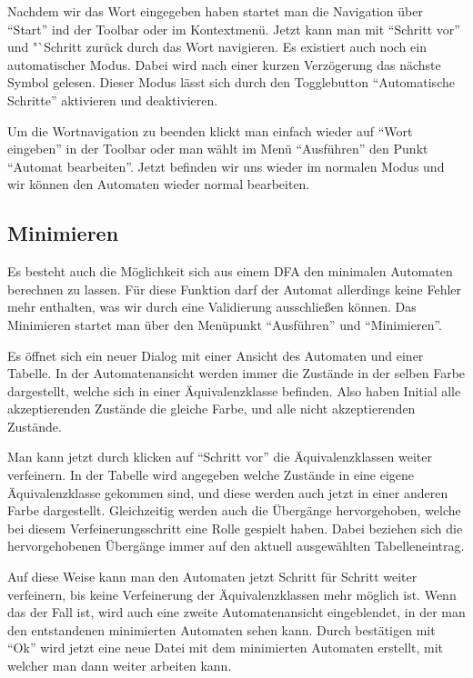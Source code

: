   Nachdem wir das Wort eingegeben haben startet man die Navigation über
  "`Start"' ind der Toolbar oder im Kontextmenü. Jetzt kann man mit "`Schritt
  vor"' und "`Schritt zurück durch das Wort navigieren. Es existiert auch noch
  ein automatischer Modus. Dabei wird nach einer kurzen Verzögerung das nächste
  Symbol gelesen. Dieser Modus lässt sich durch den Togglebutton "`Automatische
  Schritte"' aktivieren und deaktivieren.\vspace{10pt}
  
  Um die Wortnavigation zu beenden klickt man einfach wieder auf "`Wort
  eingeben"' in der Toolbar oder man wählt im Menü "`Ausführen"' den Punkt
  "`Automat bearbeiten"'. Jetzt befinden wir uns wieder im normalen Modus und
  wir können den Automaten wieder normal bearbeiten.
   
\subsection{Minimieren}
  
  Es besteht auch die Möglichkeit sich aus einem DFA den minimalen Automaten
  berechnen zu lassen. Für diese Funktion darf der Automat allerdings keine
  Fehler mehr enthalten, was wir durch eine Validierung ausschließen können.
  Das Minimieren startet man über den Menüpunkt "`Ausführen"' und
  "`Minimieren"'.\vspace{10pt}
  
  Es öffnet sich ein neuer Dialog mit einer Ansicht des Automaten und einer
  Tabelle. In der Automatenansicht werden immer die Zustände in der selben
  Farbe dargestellt, welche sich in einer Äquivalenzklasse befinden. Also
  haben Initial alle akzeptierenden Zustände die gleiche Farbe, und alle nicht
  akzeptierenden Zustände.\vspace{10pt}
  
  Man kann jetzt durch klicken auf "`Schritt vor"' die Äquivalenzklassen weiter
  verfeinern. In der Tabelle wird angegeben welche Zustände in eine eigene
  Äquivalenzklasse gekommen sind, und diese werden auch jetzt in einer anderen
  Farbe dargestellt. Gleichzeitig werden auch die Übergänge hervorgehoben,
  welche bei diesem Verfeinerungsschritt eine Rolle gespielt haben. Dabei
  beziehen sich die hervorgehobenen Übergänge immer auf den aktuell
  ausgewählten Tabelleneintrag.\vspace{10pt}
  
  Auf diese Weise kann man den Automaten jetzt Schritt für Schritt weiter
  verfeinern, bis keine Verfeinerung der Äquivalenzklassen mehr möglich ist.
  Wenn das der Fall ist, wird auch eine zweite Automatenansicht eingeblendet,
  in der man den entstandenen minimierten Automaten sehen kann. Durch
  bestätigen mit "`Ok"' wird jetzt eine neue Datei mit dem minimierten
  Automaten erstellt, mit welcher man dann weiter arbeiten kann.\vspace{10pt}
  
